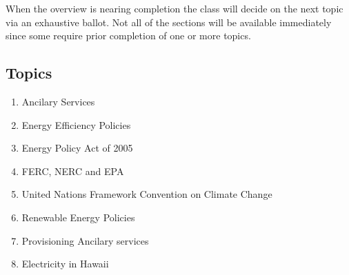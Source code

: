\documentclass[letterpaper,10pt]{article}
\begin{document}
When the overview is nearing completion the class will decide on the next topic via an exhaustive ballot.  Not all of the sections will be available immediately since some require prior completion of one or more topics.

\subsection{Topics}

\begin{enumerate}
  \item Ancilary Services
  \item Energy Efficiency Policies
  \item Energy Policy Act of 2005
  \item FERC, NERC and EPA
  \item United Nations Framework Convention on Climate Change
  \item Renewable Energy Policies


  \item Provisioning Ancilary services
  \item Electricity in Hawaii
\end{enumerate}
\end{document}
